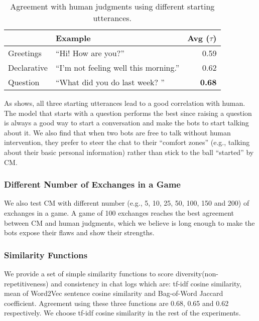\begin{table}[th!]
\centering
\scriptsize
\begin{tabular}{llr}
\toprule
 & Example  & Avg ($\tau$)\\ \midrule
Greetings  & ``Hi! How are you?'' & 0.59  \\
Declarative  & ``I'm not feeling well this morning.'' & 0.62  \\
Question  & ``What did you do last week? '' & \textbf{0.68}  \\
\bottomrule
\end{tabular}
\caption{
Agreement with human judgments using different starting utterances.} 
\label{tab:multi-context}
\end{table}

 As  shows,
 all three starting utterances lead to a 
good correlation with human. 
The model that starts with a question performs the best since 
raising a question is always a good way to start a conversation 
and make the bots to start talking about it.
We also find that when two 
bots are free to talk without human intervention, they prefer 
to steer the chat to their ``comfort zones'' (e.g., talking about 
their basic personal information) rather than stick to the ball 
``started'' by CM. 

\subsubsection*{Different Number of Exchanges in a Game} 

We also test CM with different number (e.g., 5, 10, 25, 50, 100, 150 and 200) of exchanges in a game.
A game of 100 exchanges reaches the best agreement between 
CM and human judgments, which we believe is long enough to make the bots
 expose their flaws
and show their strengths.


\subsubsection*{Similarity Functions} 
 We provide a set of simple similarity functions 
to score diversity(non-repetitiveness) and consistency in chat logs which are: 
tf-idf cosine similarity, mean of Word2Vec sentence cosine similarity 
and Bag-of-Word Jaccard coefficient. Agreement using these three functions are 0.68, 0.65 and 0.62 respectively. We choose tf-idf cosine similarity in
the rest of the experiments.

